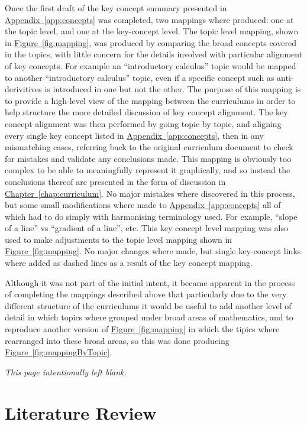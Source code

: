 \documentclass[twoside,12pt,a4paper]{report}
\makeatletter
\newcommand*{\intentionallyblankpage}{
  \vspace*{\fill}
  {\centering \textit{This page intentionally left blank.} \par}
  \vspace{\fill}}
\renewcommand*{\cleardoublepage}{\clearpage\if@twoside \ifodd\c@page\else
  \intentionallyblankpage
  \newpage
  \if@twocolumn\hbox{}\newpage\fi\fi\fi}
\newcommand{\refchap}[1]{\hyperref[chap:#1]{Chapter~\ref{chap:#1}}}
\newcommand{\reffig}[1]{\hyperref[fig:#1]{Figure~\ref{fig:#1}}}
\newcommand{\refapp}[1]{\hyperref[app:#1]{Appendix~\ref{app:#1}}}
\makeatother
\begin{document}
Once the first draft of the key concept summary presented in \refapp{concepts} was completed, two mappings where produced: one at the topic level, and one at the key-concept level. The topic level mapping, shown in \reffig{mapping}, was produced by comparing the broad concepts covered in the topics, with little concern for the details involved with particular alignment of key concepts. For example an ``introductory calculus'' topic would be mapped to another ``introductory calculus'' topic, even if a specific concept such as anti-derivitives is introduced in one but not the other. The purpose of this mapping is to provide a high-level view of the mapping between the curriculums in order to help structure the more detailed discussion of key concept alignment. The key concept alignment was then performed by going topic by topic, and aligning every single key concept listed in \refapp{concepts}, then in any mismatching cases, referring back to the original curriculum document to check for mistakes and validate any conclusions made. This mapping is obviously too complex to be able to meaningfully represent it graphically, and so instead the conclusions thereof are presented in the form of discussion in \refchap{curriculum}. No major mistakes where discovered in this process, but some small modifications where made to \refapp{concepts} all of which had to do simply with harmonising terminology used. For example, ``slope of a line'' vs ``gradient of a line'', etc. This key concept level mapping was also used to make adjustments to the topic level mapping shown in \reffig{mapping}. No major changes where made, but single key-concept links where added as dashed lines as a result of the key concept mapping. 

Although it was not part of the initial intent, it became apparent in the process of completing the mappings described above that particularly due to the very different structure of the curriculums it would be useful to add another level of detail in which topics where grouped under broad areas of mathematics, and to reproduce another version of \reffig{mapping} in which the tipics where rearranged into these broad areas, so this was done producing \reffig{mappingByTopic}.




\cleardoublepage
\chapter{Literature Review}
\label{chap:literature}
\end{document}
